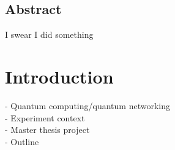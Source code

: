 \documentclass[english, a4paper, 12pt, twoside]{book}
\numberwithin{equation}{section} %
\begin{document}
{

}
\restoregeometry %

\thispagestyle{plain} %
\clearpage\mbox{}\clearpage %

\newpage

\section*{Abstract}
I swear I did something

\newpage


\newpage
\tableofcontents


\newpage
{} %
\setcounter{page}{1} %

\chapter{Introduction} %

- Quantum computing/quantum networking \\
- Experiment context\\
- Master thesis project\\
- Outline\\
\newline
\end{document}
